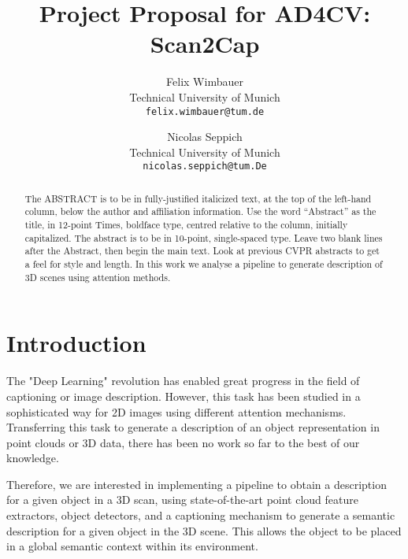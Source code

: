 \documentclass[10pt,twocolumn,letterpaper]{article}
\begin{document}
\title{Project Proposal for AD4CV: Scan2Cap}

\author{Felix Wimbauer\\
Technical University of Munich\\
{\tt\small felix.wimbauer@tum.de}
\and
Nicolas Seppich\\
Technical University of Munich\\
{\tt\small nicolas.seppich@tum.De}
}

\maketitle

\begin{abstract}
   The ABSTRACT is to be in fully-justified italicized text, at the top
   of the left-hand column, below the author and affiliation
   information. Use the word ``Abstract'' as the title, in 12-point
   Times, boldface type, centred relative to the column, initially
   capitalized. The abstract is to be in 10-point, single-spaced type.
   Leave two blank lines after the Abstract, then begin the main text.
   Look at previous CVPR abstracts to get a feel for style and length.
   In this work we analyse a pipeline to generate description of 3D scenes using attention methods. 
   
\end{abstract}

\section{Introduction}

The "Deep Learning" revolution has enabled great progress in the field of captioning or image description. However, this task has been studied in a sophisticated way for 2D images using different attention mechanisms.
Transferring this task to generate a description of an object representation in point clouds or 3D data, there has been no work so far to the best of our knowledge.

Therefore, we are interested in implementing a pipeline to obtain a description for a given object in a 3D scan, using state-of-the-art point cloud feature extractors, object detectors, and a captioning mechanism to generate a semantic description for a given object in the 3D scene. This allows the object to be placed in a global semantic context within its environment.
 
\end{document}
